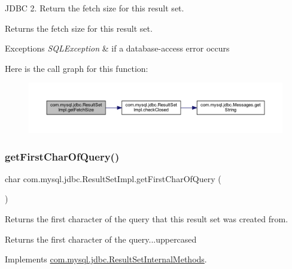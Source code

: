 J\+D\+BC 2. Return the fetch size for this result set.

\begin{DoxyReturn}{Returns}
the fetch size for this result set.
\end{DoxyReturn}

\begin{DoxyExceptions}{Exceptions}
{\em S\+Q\+L\+Exception} & if a database-\/access error occurs \\
\hline
\end{DoxyExceptions}
Here is the call graph for this function\+:
\nopagebreak
\begin{figure}[H]
\begin{center}
\leavevmode
\includegraphics[width=350pt]{classcom_1_1mysql_1_1jdbc_1_1_result_set_impl_a9ae5eab29975fd26c16dbbb802465632_cgraph}
\end{center}
\end{figure}
\mbox{\label{classcom_1_1mysql_1_1jdbc_1_1_result_set_impl_a89ddba59e7cbed718934f80f443f69f8}} 
\subsubsection{\texorpdfstring{get\+First\+Char\+Of\+Query()}{getFirstCharOfQuery()}}
{\footnotesize\ttfamily char com.\+mysql.\+jdbc.\+Result\+Set\+Impl.\+get\+First\+Char\+Of\+Query (\begin{DoxyParamCaption}{ }\end{DoxyParamCaption})}

Returns the first character of the query that this result set was created from.

\begin{DoxyReturn}{Returns}
the first character of the query...uppercased 
\end{DoxyReturn}


Implements \mbox{\hyperlink{interfacecom_1_1mysql_1_1jdbc_1_1_result_set_internal_methods_ad7091c487cd2a0ad8550ed98e489e535}{com.\+mysql.\+jdbc.\+Result\+Set\+Internal\+Methods}}.

